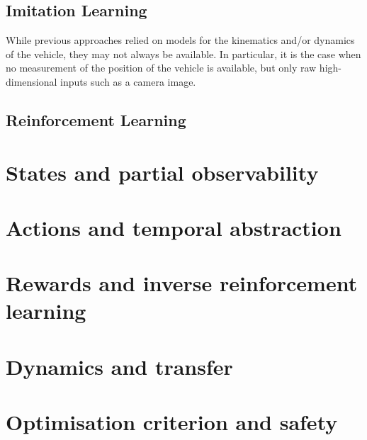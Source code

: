 \subsection{Imitation Learning}

While previous approaches relied on models for the kinematics and/or dynamics of the vehicle, they may not always be available. In particular, it is the case when no measurement of the position of the vehicle is available, but only raw high-dimensional inputs such as a camera image. 


\subsection{Reinforcement Learning}
\section{States and partial observability}
\section{Actions and temporal abstraction}
\section{Rewards and inverse reinforcement learning}
\section{Dynamics and transfer}
\section{Optimisation criterion and safety}
